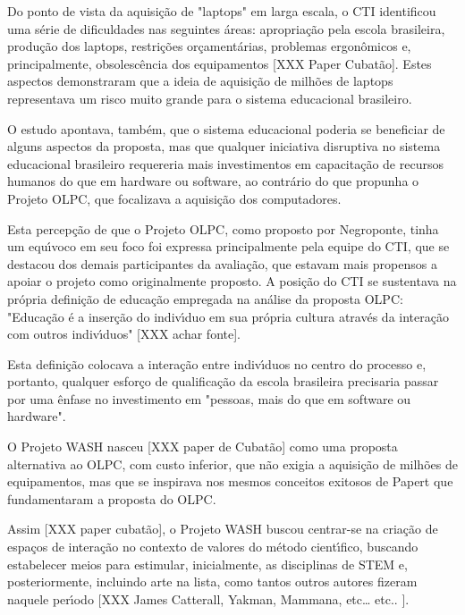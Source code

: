 \documentclass[
12pt,		%
openright,	%
twoside,  %
a4paper,			%
chapter=TITLE,		%
english,			%
french,				%
spanish,			%
brazil				%
]{USPSC-classe/USPSC}
\begin{document}
Do ponto de vista da aquisi\c{c}\~ao de "laptops" em larga escala, o CTI identificou uma s\'erie de dificuldades nas seguintes \'areas: apropria\c{c}\~ao pela escola brasileira, produ\c{c}\~ao dos laptops, restri\c{c}\~oes or\c{c}ament\'arias, problemas ergon\^omicos e, principalmente, obsolesc\^encia dos equipamentos [XXX Paper Cubat\~ao]. Estes aspectos demonstraram que a ideia de aquisi\c{c}\~ao de milh\~oes de laptops representava um risco muito grande para o sistema educacional brasileiro.


O estudo apontava, tamb\'em, que o sistema educacional poderia se beneficiar de alguns aspectos da proposta, mas que qualquer iniciativa disruptiva no sistema educacional brasileiro requereria mais investimentos em capacita\c{c}\~ao de recursos humanos do que em hardware ou software, ao contr\'ario do que propunha o Projeto OLPC, que focalizava a aquisi\c{c}\~ao dos computadores.


Esta percep\c{c}\~ao de que o Projeto OLPC, como proposto por Negroponte, tinha um equ\'{\i}voco em seu foco foi expressa principalmente pela equipe do CTI, que se destacou dos demais participantes da avalia\c{c}\~ao, que estavam mais propensos a apoiar o projeto como originalmente proposto. A posi\c{c}\~ao do CTI se sustentava na pr\'opria defini\c{c}\~ao de educa\c{c}\~ao empregada na an\'alise da proposta OLPC: "Educa\c{c}\~ao \'e a inser\c{c}\~ao do indiv\'{\i}duo em sua pr\'opria cultura atrav\'es da intera\c{c}\~ao com outros indiv\'{\i}duos" [XXX achar fonte].


Esta defini\c{c}\~ao colocava a intera\c{c}\~ao entre indiv\'{\i}duos no centro do processo e, portanto, qualquer esfor\c{c}o de qualifica\c{c}\~ao da escola brasileira precisaria passar por uma \^enfase no investimento em "pessoas, mais do que em software ou hardware".


O Projeto WASH nasceu [XXX paper de Cubat\~ao] como uma proposta alternativa ao OLPC, com custo inferior, que n\~ao exigia a aquisi\c{c}\~ao de milh\~oes de equipamentos, mas que se inspirava nos mesmos conceitos exitosos de Papert que fundamentaram a proposta do OLPC.


Assim [XXX paper cubat\~ao], o Projeto WASH buscou centrar-se na cria\c{c}\~ao de espa\c{c}os de intera\c{c}\~ao no contexto de valores do m\'etodo cient\'{\i}fico, buscando estabelecer meios para estimular, inicialmente, as disciplinas de STEM e, posteriormente, incluindo arte na lista, como tantos outros autores fizeram naquele per\'{\i}odo [XXX James Catterall, Yakman, Mammana, etc… etc.. ].
\end{document}
